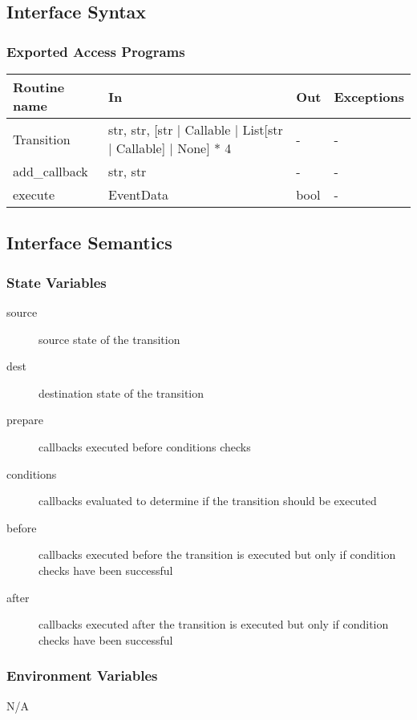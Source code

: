 \documentclass[12pt,titlepage]{article}
\begin{document}
\subsection{Interface Syntax}
\subsubsection{Exported Access Programs}
\begin{tabular}{| l | l | l | l |}
  \hline
  \textbf{Routine name} & \textbf{In} & \textbf{Out} & \textbf{Exceptions}\\
  \hline
  Transition &  str,
                str,
                [str | Callable | List[str | Callable] | None] * 4 & - & - \\
  add\_callback & str, str & - & - \\
  execute & EventData & bool & - \\
  \hline
\end{tabular}

\subsection{Interface Semantics}
\subsubsection{State Variables}

\begin{description}
\item[source] source state of the transition
\item[dest] destination state of the transition
\item[prepare] callbacks executed before conditions checks
\item[conditions] callbacks evaluated to determine if the transition should be
  executed
\item[before] callbacks executed before the transition is executed but only if
  condition checks have been successful
\item[after] callbacks executed after the transition is executed but only if
  condition checks have been successful
\end{description}

\subsubsection{Environment Variables}

N/A
\end{document}
